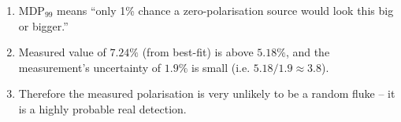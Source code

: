 \begin{itemize}
\begin{enumerate}
        	\item $\text{MDP}_{99}$ means ``only 1\% chance a zero-polarisation source would look this big or bigger.''
        	
        	\item Measured value of $7.24\%$ (from best-fit) is above $5.18\%$, and the measurement's uncertainty of $1.9\%$ is small (i.e. $5.18/1.9\approx 3.8$).
        	
        	\item Therefore the measured polarisation is very unlikely to be a random fluke -- it is a highly probable real detection.
        \end{enumerate}
    \end{itemize}